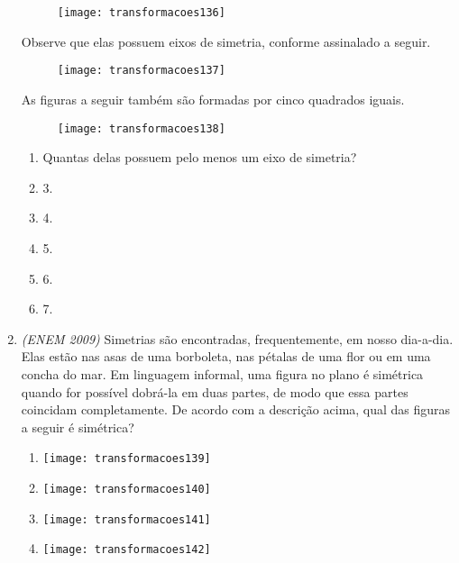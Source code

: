 \begin{enumerate}
\begin{figure}[H]
\texttt{[image: transformacoes136]}
\end{figure}

Observe que elas possuem eixos de simetria, conforme assinalado a seguir.
\begin{figure}[H]
\centering

\texttt{[image: transformacoes137]}
\end{figure}

As figuras a seguir também são formadas por cinco quadrados iguais.


\begin{figure}[H]
\centering

\texttt{[image: transformacoes138]}
\end{figure}

\begin{enumerate}
\item Quantas delas possuem pelo menos um eixo de simetria?
\item 3.
\item 4.
\item 5. 
\item 6.
\item 7.
\end{enumerate}

\item \textit{(ENEM 2009)} Simetrias são encontradas, frequentemente, em nosso dia-a-dia. Elas estão nas asas de uma borboleta, nas pétalas de uma flor ou em uma concha do mar. Em linguagem informal, uma figura no plano é simétrica quando for possível dobrá-la em duas partes, de modo que essa partes coincidam completamente. De acordo com a descrição acima, qual das figuras a seguir é simétrica?

\begin{multicols}{2}
\begin{enumerate}
\item {}
{
\texttt{[image: transformacoes139]}
}

\item {}
{
\texttt{[image: transformacoes140]}
}

\item {}
{
\texttt{[image: transformacoes141]}
}

\item {}
{
\texttt{[image: transformacoes142]}
}
\end{enumerate}
\end{multicols}


\end{enumerate}

